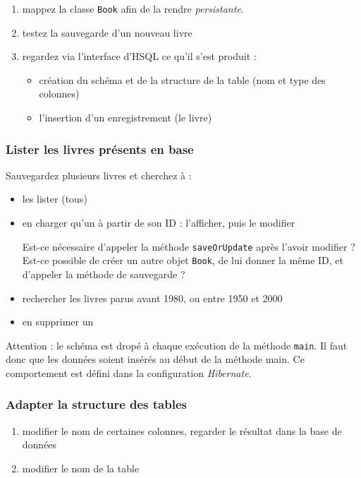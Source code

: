 \documentclass[small,algo]{dushClass}
\begin{document}
\begin{enumerate}
\item mappez la classe \texttt{Book} afin de la rendre \emph{persistante}.
\item testez la sauvegarde d'un nouveau livre
\item regardez via l'interface d'HSQL ce qu'il s'est produit :
\begin{itemize}
\item création du schéma et de la structure de la table (nom et type des colonnes)
\item l'insertion d'un enregistrement (le livre)
\end{itemize}
\end{enumerate}

\subsubsection{Lister les livres présents en base}

Sauvegardez plusieurs livres et cherchez à :
\begin{itemize}
\item les lister (tous)
\item en charger qu'un à partir de son ID : l'afficher, puis le modifier\par
Est-ce nécessaire d'appeler la méthode \texttt{saveOrUpdate} après l'avoir modifier ? Est-ce possible de créer un autre objet \texttt{Book}, de lui donner la même ID, et d'appeler la méthode de sauvegarde ?
\item rechercher les livres parus avant 1980, ou entre 1950 et 2000
\item en supprimer un\\
\end{itemize}

Attention : le schéma est dropé à chaque exécution de la méthode \texttt{main}. Il faut donc que les données soient insérés au début de la méthode main. Ce comportement est défini dans la configuration \emph{Hibernate}.
\subsubsection{Adapter la structure des tables}

\begin{enumerate}
\item modifier le nom de certaines colonnes, regarder le résultat dans la base de données
\item modifier le nom de la table
\end{enumerate}
\end{document}
